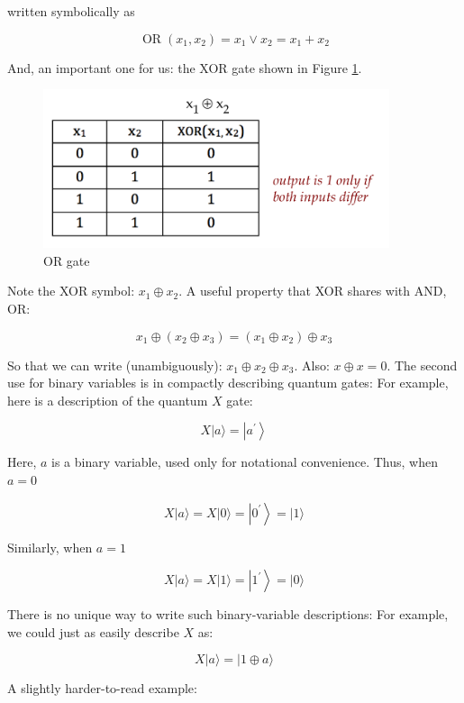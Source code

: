 \documentclass[main.tex]{subfiles}
\begin{document}
    written symbolically as
    
    $$
    \operatorname{OR}\left(x_{1}, x_{2}\right)=x_{1} \vee x_{2}=x_{1}+x_{2}
    $$
    
    And, an important one for us: the XOR gate shown in Figure \ref{fig:07classical-xor}.
    
    \begin{figure}
        \centering
        \includegraphics[width=4in]{notes/figs/n10/07classical-xor.png}
        \caption{OR gate}
        \label{fig:07classical-xor}
    \end{figure}
    
    Note the XOR symbol: $x_{1} \oplus x_{2}$. A useful property that XOR shares with AND, OR:
    
    $$
    x_{1} \oplus\left(x_{2} \oplus x_{3}\right)=\left(x_{1} \oplus x_{2}\right) \oplus x_{3}
    $$
    
    So that we can write (unambiguously): $x_{1} \oplus x_{2} \oplus x_{3}$. Also: $x \oplus x=0$. The second use for binary variables is in compactly describing quantum gates: For example, here is a description of the quantum $X$ gate:
    
    $$
    X|a\rangle=\left|a^{\prime}\right\rangle
    $$
    
    Here, $a$ is a binary variable, used only for notational convenience. Thus, when $a=0$
    
    $$
    X|a\rangle=X|0\rangle=\left|0^{\prime}\right\rangle=|1\rangle
    $$
    
    Similarly, when $a=1$
    
    $$
    X|a\rangle=X|1\rangle=\left|1^{\prime}\right\rangle=|0\rangle
    $$
    
    There is no unique way to write such binary-variable descriptions: For example, we could just as easily describe $X$ as:
    
    $$
    X|a\rangle=|1 \oplus a\rangle
    $$
    
    A slightly harder-to-read example:
    
\end{document}
